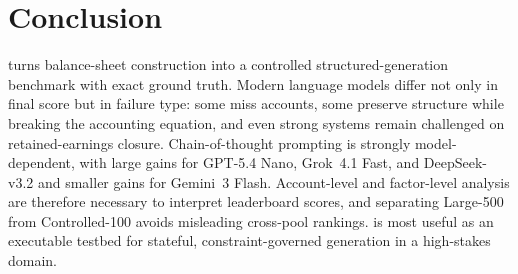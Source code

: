 \section{Conclusion}

\benchmark{} turns balance-sheet construction into a controlled
structured-generation benchmark with exact ground truth.
Modern language models differ not only in final score but in failure
type: some miss accounts, some preserve structure while breaking the
accounting equation, and even strong systems remain challenged on
retained-earnings closure.
Chain-of-thought prompting is strongly model-dependent, with large gains for GPT-5.4 Nano,
Grok~4.1 Fast, and DeepSeek-v3.2 and smaller gains for
Gemini~3 Flash.
Account-level and factor-level analysis are therefore necessary to
interpret leaderboard scores, and separating Large-500 from
Controlled-100 avoids misleading cross-pool rankings.
\benchmark{} is most useful as an executable testbed for stateful,
constraint-governed generation in a high-stakes domain.
